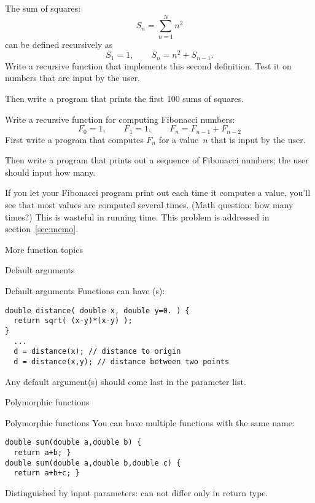 \begin{exercise}
  \label{ex:recur-sum}
  The sum of squares:
  \[ S_n = \sum_{n=1}^N n^2 \]
  can be defined recursively as
  \[ S_1=1,\qquad S_n = n^2 + S_{n-1}. \]
  Write a recursive function that implements this second definition.
  Test it on numbers that are input by the user.

  Then write a program that prints the first 100 sums of squares.
\end{exercise}

\begin{exercise}
  \label{ex:recur-fib}
  Write a recursive function for computing Fibonacci numbers:
  \[ F_0=1,\qquad F_1=1,\qquad F_{n}=F_{n-1}+F_{n-2} \]
  First write a program that computes $F_n$ for a value~$n$ that is
  input by the user.

  Then write a program that prints out a sequence of Fibonacci
  numbers; the user should input how many.
\end{exercise}

If you let your Fibonacci program print out each time it computes a
value, you'll see that most values are computed several times. (Math
question: how many times?) This is wasteful in running time. This
problem is addressed in section~\ref{sec:memo}.

 {More function topics}

 {Default arguments}

\begin{block}{Default arguments}
  \label{sl:def-arg}
  Functions can have (s):
\begin{verbatim}
double distance( double x, double y=0. ) {
  return sqrt( (x-y)*(x-y) );
}
  ...
  d = distance(x); // distance to origin
  d = distance(x,y); // distance between two points
\end{verbatim}
Any default argument(s) should come last in the parameter list.
\end{block}

 {Polymorphic functions}
\label{sec:polyfunc}

\begin{block}{Polymorphic functions}
  \label{sl:func-poly}
  You can have multiple functions with the same name:
\begin{verbatim}
double sum(double a,double b) {
  return a+b; }
double sum(double a,double b,double c) {
  return a+b+c; }
\end{verbatim}
Distinguished by input parameters: can not differ only in return type.
\end{block}

